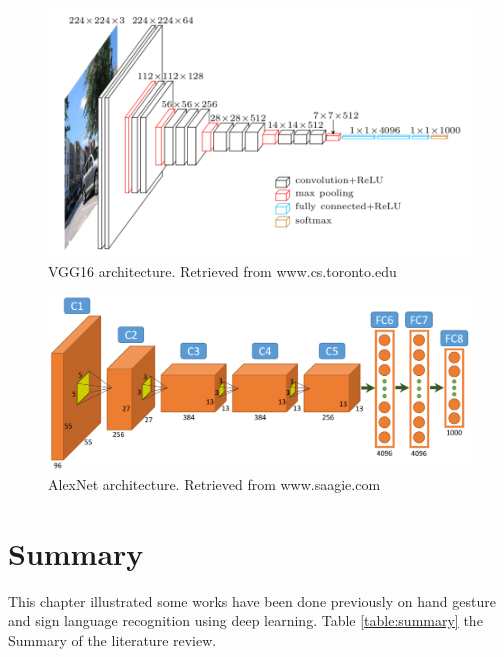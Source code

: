 \documentclass[12pt]{report}
\begin{document}
                    \begin{figure}[h]
                        \centering
                        \includegraphics[width=.9\textwidth]{images/vgg16.png}
                        \caption{VGG16 architecture. Retrieved from www.cs.toronto.edu}
                        \label{fig:vgg16}
                    \end{figure}
                    \begin{figure}[h]
                        \centering
                        \includegraphics[width=.8\textwidth]{images/alexnet.png}
                        \caption{AlexNet architecture. Retrieved from www.saagie.com}
                        \label{fig:alexnet}
                    \end{figure}

            \clearpage
            \section{Summary}
                 
                    This chapter illustrated some works have been done previously on
                    hand gesture and sign language recognition using deep learning.
                    Table \ref{table:summary} the Summary of the literature review.
                    
\end{document}
